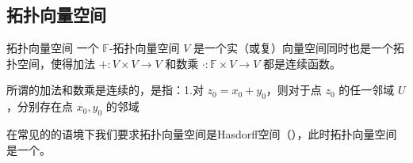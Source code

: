 
\subsection{拓扑向量空间}

\begin{definition}{拓扑向量空间}
一个 $\mathbb{F}$-拓扑向量空间 $V$ 是一个实（或复）向量空间同时也是一个拓扑空间，使得加法 $+: V \times V \to V$ 和数乘 $\cdot: \mathbb{F} \times V \to V$ 都是连续函数。

\end{definition}
所谓的加法和数乘是连续的，是指：1.对 $z_0=x_0+y_0$，则对于点 $z_0$ 的任一邻域 $U$，分别存在点 $x_0,y_0$ 的邻域 $$


在常见的的语境下我们要求拓扑向量空间是Hasdorff空间（），此时拓扑向量空间是一个。

